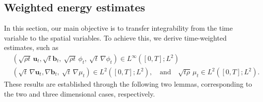 \documentclass[11pt]{article}
\numberwithin{equation}{section}
\begin{document}
\subsection{Weighted energy estimates }
\label{extra}
In this section, our main objective is to transfer integrability from the time variable to the spatial variables.
To achieve this, we derive time-weighted estimates, such as
\begin{align*}
&(\sqrt{\rho t}\,\mathbf{u}_t,\sqrt{t}\mathbf{b}_t, \ \sqrt{\rho t}\,\phi_t, \ \sqrt{t}\,\nabla \phi_t) \in L^{\infty}([0,T]; L^2)\\
&(\sqrt{t}\,\nabla \mathbf{u}_t,\nabla \mathbf{b}_t, \ \sqrt{t}\,\nabla \mu_t) \in L^2([0,T]; L^2),
\quad \text{and} \quad
\sqrt{t\rho}\,\mu_t \in L^2([0,T]; L^2).
\end{align*}
These results are established through the following two lemmas, corresponding to the two and three dimensional cases, respectively.
\end{document}
